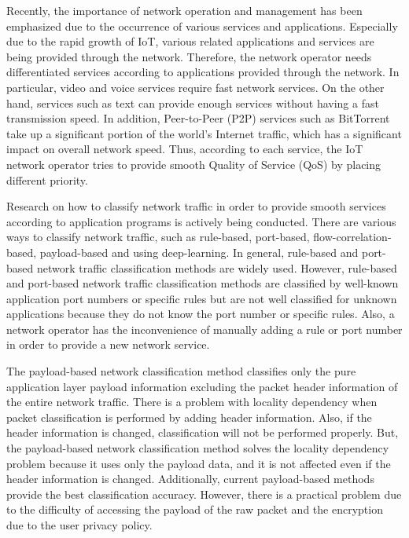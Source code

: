 Recently, the importance of network operation and management has been emphasized due to the occurrence of various services and applications.
Especially due to the rapid growth of IoT, various related applications and services are being provided through the network.
Therefore, the network operator needs differentiated services according to applications provided through the network.
In particular, video and voice services require fast network services.
On the other hand, services such as text can provide enough services without having a fast transmission speed.
In addition, Peer-to-Peer (P2P) services such as BitTorrent take up a significant portion of the world's Internet traffic, which has a significant impact on overall network speed.
Thus, according to each service, the IoT network operator tries to provide smooth Quality of Service (QoS) by placing different priority.

Research on how to classify network traffic \cite{Gupta:2001:APC:2329014.2329458,Boutaba2018,Meidan:2017:PML:3019612.3019878,L6392563} in order to provide smooth services according to application programs is actively being conducted.
There are various ways to classify network traffic, such as rule-based, port-based, flow-correlation-based, payload-based and using deep-learning.
In general, rule-based and port-based network traffic classification methods are widely used.
However, rule-based and port-based network traffic classification methods are classified by well-known application port numbers or specific rules but are not well classified for unknown applications because they do not know the port number or specific rules.
Also, a network operator has the inconvenience of manually adding a rule or port number in order to provide a new network service.

The payload-based \cite{F4534133,Bernaille:2006:EAI:1368436.1368445,Erman:2007:IDW:1242572.1242692} network classification method classifies only the pure application layer payload information excluding the packet header information of the entire network traffic.
There is a problem with locality dependency when packet classification is performed by adding header information.
Also, if the header information is changed, classification will not be performed properly.
But, the payload-based network classification method solves the locality dependency problem because it uses only the payload data, and it is not affected even if the header information is changed.
Additionally, current payload-based methods provide the best classification accuracy.
However, there is a practical problem due to the difficulty of accessing the payload of the raw packet and the encryption due to the user privacy policy.

